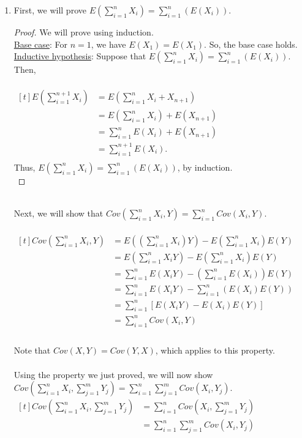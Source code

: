 \documentclass{article}
\begin{document}
\begin{enumerate}
    \item
    First, we will prove $\displaystyle{E(\sum_{i=1}^{n}X_i)=\sum_{i=1}^{n}(E(X_i))}$.\\
    \begin{proof}
        We will prove using induction.\\
        \underline{Base case}: For $n=1$, we have $E(X_1)=E(X_1)$. So, the base case holds.\\
        \underline{Inductive hypothesis}: Suppose that $\displaystyle{E(\sum_{i=1}^{n}X_i)=\sum_{i=1}^{n}(E(X_i))}$.
        Then,\\
        \ \\
        $\begin{aligned}[t]
        E(\sum_{i=1}^{n+1}X_i)&=E(\sum_{i=1}^{n}X_i+X_{n+1})\\
        &= E(\sum_{i=1}^{n}X_i)+E(X_{n+1})\\
        &=\sum_{i=1}^{n}E(X_i)+E(X_{n+1})\\
        &=\sum_{i=1}^{n+1}E(X_i).\\
        \end{aligned}$
        \ \\
        Thus, $\displaystyle{E(\sum_{i=1}^{n}X_i)=\sum_{i=1}^{n}(E(X_i))}$, by induction.\\
    \end{proof}
    \ \\
    Next, we will show that $\displaystyle{Cov(\sum_{i=1}^{n}X_i,Y)=\sum_{i=1}^{n}Cov(X_i,Y)}$.\\
    \ \\
    $\begin{aligned}[t]
        Cov(\sum_{i=1}^{n}X_i,Y)&=E((\sum_{i=1}^{n}X_i)Y)-E(\sum_{i=1}^{n}X_i)E(Y)\\
        &=E(\sum_{i=1}^{n}X_iY)-E(\sum_{i=1}^{n}X_i)E(Y)\\
        &=\sum_{i=1}^{n}E(X_iY)-(\sum_{i=1}^{n}E(X_i))E(Y)\\
        &=\sum_{i=1}^{n}E(X_iY)-\sum_{i=1}^{n}(E(X_i)E(Y))\\
        &=\sum_{i=1}^{n}[E(X_iY)-E(X_i)E(Y)]\\
        &=\sum_{i=1}^{n}Cov(X_i,Y)\\
    \end{aligned}$
    \ \\
    \\Note that $Cov(X,Y)=Cov(Y,X)$, which applies to this property.
    \ \\
    \\Using the property we just proved, we will now show $\displaystyle{Cov(\sum_{i=1}^{n}X_i,\sum_{j=1}^{m}Y_j)=\sum_{i=1}^{n}\sum_{j=1}^{m}Cov(X_i,Y_j)}$.\\
    $\begin{aligned}[t]
        Cov(\sum_{i=1}^{n}X_i,\sum_{j=1}^{m}Y_j)&=\sum_{i=1}^{n}Cov(X_i,\sum_{j=1}^{m}Y_j)\\
        &=\sum_{i=1}^{n}\sum_{j=1}^{m}Cov(X_i,Y_j)\\
        \ \\
    \end{aligned}$
    \ \\
    

\end{enumerate}
\end{document}
